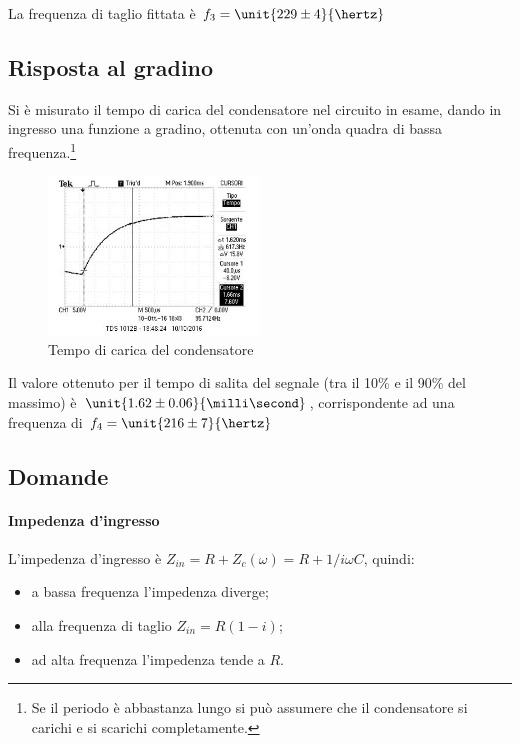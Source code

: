 \documentclass[10pt,a4paper]{article}
\begin{document}
La frequenza di taglio fittata è $f_3 = \unit{229 \pm 4}{\hertz}$

\subsection{Risposta al gradino}
Si è misurato il tempo di carica del condensatore nel circuito in esame, dando in ingresso una funzione a gradino, ottenuta con un'onda quadra di bassa frequenza.\footnote{Se il periodo è abbastanza lungo si può assumere che il condensatore si carichi e si scarichi completamente.}

\begin{figure}[h!]
	\centering
	\includegraphics[width=0.5\textwidth]{../oscilloscopio/raise_time.jpg}
	\caption{Tempo di carica del condensatore}
	\label{fig:raise}
\end{figure}

Il valore ottenuto per il tempo di salita del segnale (tra il 10\% e il 90\% del massimo) è $\unit{1.62 \pm 0.06}{\milli\second}$, corrispondente ad una frequenza di $f_4 = \unit{216 \pm 7}{\hertz}$

\subsection{Domande}

\paragraph{Impedenza d'ingresso} L'impedenza d'ingresso è $Z_{in} = R + Z_c(\omega) = R + 1/i\omega C$, quindi:
\begin{itemize}
\item a bassa frequenza l'impedenza diverge;
\item alla frequenza di taglio $Z_{in} = R(1-i)$;
\item ad alta frequenza l'impedenza tende a $R$.
\end{itemize}
\end{document}
